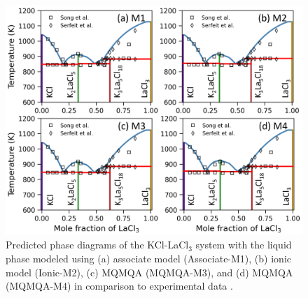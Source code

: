 \begin{figure}[H]
    \centering
    \includegraphics[width=0.9\linewidth]{moltensalts/Moltensalts-LaCl3-PhaseDiagram-Fourmodels-m.png}
    \caption{Predicted phase diagrams of the KCl-LaCl$_3$ system with the liquid phase modeled using (a) associate model (Associate-M1), (b) ionic model (Ionic-M2), (c) MQMQA (MQMQA-M3), and (d) MQMQA (MQMQA-M4) in comparison to experimental data \cite{seifert1985thermodynamic, song1995investigation}.}
    \label{ms:fig:lacl3PDfourm}
\end{figure}

